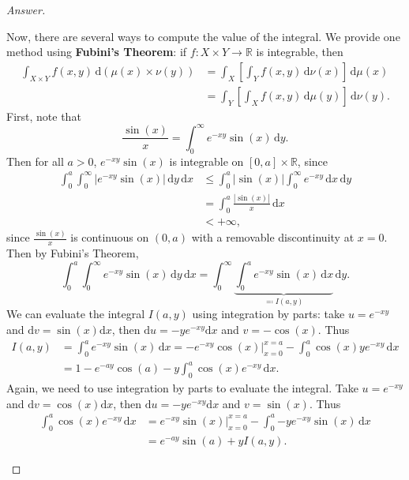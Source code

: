 \documentclass[12pt]{article}
\newcommand{\real}{\mathbb{R}}
\newcommand\paren[1]{\left( #1 \right)}
\newcommand{\sqbrack}[1]{\left [ #1 \right ]}
\newcommand{\abs}[1]{\left | #1 \right |}
\renewcommand{\i}[4]{\int_{#1}^{#2} {#3} \, \mathrm{d} {#4} }
\newcommand{\rd}{\mathrm{d}}
\theoremstyle{definition}
\begin{document}
\begin{proof}[Answer]
\begin{enumerate}[(a)]
\begin{enumerate}[(i)]
            Now, there are several ways to compute the value of the integral. We provide one method using \textbf{Fubini's Theorem}: if $f : X \times Y \to \real$ is integrable, then
            \begin{align*}
                \i{X \times Y}{}{f(x,y)}{\paren{ \mu(x) \times \nu(y) }} & = \i{X}{}{ \sqbrack{ \i{Y}{}{f(x,y)}{\nu(x)} } }{\mu(x)} \\ 
                & = \i{Y}{}{ \sqbrack{ \i{X}{}{f(x,y)}{\mu(y)} } }{\nu(y)} . 
            \end{align*}
            First, note that 
            \[
                \frac{\sin(x)}{x} = \i{0}{\infty}{ e^{-xy} \sin(x) }{y} . 
            \]
            Then for all $a > 0$, $e^{-xy} \sin(x)$ is integrable on $[0,a] \times \real$, since 
            \begin{align*}
                \i{0}{a}{ \i{0}{\infty}{ \abs{ e^{-xy} \sin(x) } }{y} }{x} & \leq \i{0}{a}{ \abs{ \sin(x) } \i{0}{\infty}{ e^{-xy} }{x} }{y} \\ 
                & = \i{0}{a}{ \frac{\abs{\sin(x)}}{x} }{x} \\ 
                & < +\infty , 
            \end{align*}
            since $\frac{\sin(x)}{x}$ is continuous on $(0,a)$ with a removable discontinuity at $x = 0$. Then by Fubini's Theorem, 
            \[
                \i{0}{a}{ \i{0}{\infty}{  e^{-xy} \sin(x) }{y} }{x} = \i{0}{\infty}{ \underbrace{ \i{0}{a}{  e^{-xy} \sin(x) }{x} }_{ \eqqcolon I(a,y) } }{y} .
            \]
            We can evaluate the integral $I(a,y)$ using integration by parts: take $u = e^{-xy}$ and $\rd v = \sin(x) \rd x$, then $\rd u = -y e^{-xy} \rd x$ and $v = -\cos(x)$. Thus 
            \begin{align*}
                I(a,y) & = \i{0}{a}{  e^{-xy} \sin(x) }{x} = \left. -e^{-xy} \cos(x) \right|_{x = 0}^{x = a} - \i{0}{a}{ \cos(x) y e^{-xy} }{x} \\ 
                & = 1 - e^{-ay} \cos(a) - y \i{0}{a}{ \cos(x) e^{-xy} }{x} . 
            \end{align*}
            Again, we need to use integration by parts to evaluate the integral. Take $u = e^{-xy}$ and $\rd v = \cos(x) \rd x$, then $\rd u = -y e^{-xy} \rd x$ and $v = \sin(x)$. Thus 
            \begin{align*}
                \i{0}{a}{ \cos(x) e^{-xy} }{x} & = \left. e^{-xy} \sin(x) \right|_{x = 0}^{x = a} - \i{0}{a}{-y e^{-xy} \sin(x)}{x} \\ 
                & = e^{-ay} \sin(a) + y I(a,y) . 

\end{align*}
\end{enumerate}
\end{enumerate}
\end{proof}
\end{document}
